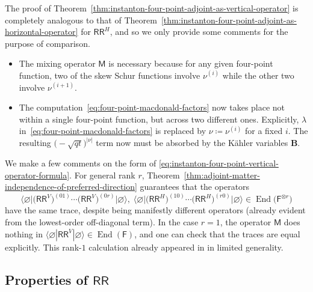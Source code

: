 \documentclass[pdftex]{sigma}%
\numberwithin{equation}{section}
\renewcommand{\vec}[1]{\bm{#1}}
\newcommand{\sF}{\mathsf{F}}
\newcommand{\sM}{\mathsf{M}}
\newcommand{\sRR}{\mathsf{RR}}
\DeclareMathOperator{\End}{End}
\begin{document}
\begin{MyParagraph}
The proof of
Theorem~\ref{thm:instanton-four-point-adjoint-as-vertical-operator} is
completely analogous to that of
Theorem~\ref{thm:instanton-four-point-adjoint-as-horizontal-operator}
for $\sRR^H$, and so we only provide some comments for the purpose of
comparison.
\begin{itemize}\itemsep=0pt
\item The mixing operator $\sM$ is necessary because for any given
 four-point function, two of the skew Schur functions involve
 $\nu^{(i)}$ while the other two involve $\nu^{(i+1)}$.
\item The computation~\eqref{eq:four-point-macdonald-factors} now
 takes place not within a single four-point function, but across two
 different ones. Explicitly, $\lambda$ in~\eqref{eq:four-point-macdonald-factors} is replaced by $\nu
 \coloneqq \nu^{(i)}$ for a fixed $i$. The resulting
 $\big({-}\sqrt{qt}\big)^{|\nu|}$ term now must be absorbed by the K\"ahler
 variables $\vec B$.
\end{itemize}
\end{MyParagraph}

\begin{MyParagraph}
We make a few comments on the form of
\eqref{eq:instanton-four-point-vertical-operator-formula}. For general
rank $r$,
Theorem~\ref{thm:adjoint-matter-independence-of-preferred-direction}
guarantees that the operators
\[ \big\langle \varnothing \big| \big(\sRR^V\big)^{(01)} \cdots \big(\sRR^V\big)^{(0r)} \big| \varnothing\big\rangle, \; \big\langle\varnothing \big| \big(\sRR^H\big)^{(10)} \cdots \big(\sRR^H\big)^{(r0)} | \varnothing\big\rangle \in \End\big(\sF^{\otimes r}\big) \]
have the same trace, despite being manifestly different operators
(already evident from the lowest-order off-diagonal term). In the case
$r = 1$, the operator $\sM$ does nothing in
$\big\langle\varnothing | \sRR^V | \varnothing\big\rangle \in \End(\sF)$, and one can
check that the traces are equal explicitly. This rank-$1$ calculation
already appeared in \cite[Section~5]{Iqbal2010} in limited generality.
\end{MyParagraph}

\subsection[Properties of RR]{Properties of $\boldsymbol{\sRR}$}
\label{sec:properties-of-RR}
\end{document}
